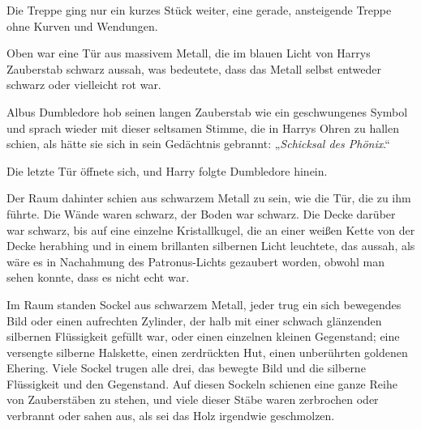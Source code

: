 Die Treppe ging nur ein kurzes Stück weiter, eine gerade, ansteigende Treppe ohne Kurven und Wendungen.

Oben war eine Tür aus massivem Metall, die im blauen Licht von Harrys Zauberstab schwarz aussah, was bedeutete, dass das Metall selbst entweder schwarz oder vielleicht rot war.

Albus Dumbledore hob seinen langen Zauberstab wie ein geschwungenes Symbol und sprach wieder mit dieser seltsamen Stimme, die in Harrys Ohren zu hallen schien, als hätte sie sich in sein Gedächtnis gebrannt:
„\emph{Schicksal des Phönix}.“

Die letzte Tür öffnete sich, und Harry folgte Dumbledore hinein.

Der Raum dahinter schien aus schwarzem Metall zu sein, wie die Tür, die zu ihm führte. Die Wände waren schwarz, der Boden war schwarz. Die Decke darüber war schwarz, bis auf eine einzelne Kristallkugel, die an einer weißen Kette von der Decke herabhing und in einem brillanten silbernen Licht leuchtete, das aussah, als wäre es in Nachahmung des Patronus-Lichts gezaubert worden, obwohl man sehen konnte, dass es nicht echt war.

Im Raum standen Sockel aus schwarzem Metall, jeder trug ein sich bewegendes Bild oder einen aufrechten Zylinder, der halb mit einer schwach glänzenden silbernen Flüssigkeit gefüllt war, oder einen einzelnen kleinen Gegenstand; eine versengte silberne Halskette, einen zerdrückten Hut, einen unberührten goldenen Ehering. Viele Sockel trugen alle drei, das bewegte Bild und die silberne Flüssigkeit und den Gegenstand. Auf diesen Sockeln schienen eine ganze Reihe von Zauberstäben zu stehen, und viele dieser Stäbe waren zerbrochen oder verbrannt oder sahen aus, als sei das Holz irgendwie geschmolzen.

